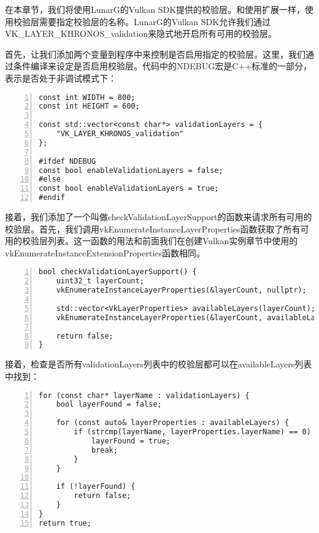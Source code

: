 \documentclass{ctexart}
\begin{document}
在本章节，我们将使用LunarG的Vulkan SDK提供的校验层。和使用扩展一样，使用校验层需要指定校验层的名称。LunarG的Vulkan SDK允许我们通过VK\_LAYER\_KHRONOS\_validation来隐式地开启所有可用的校验层。

首先，让我们添加两个变量到程序中来控制是否启用指定的校验层。这里，我们通过条件编译来设定是否启用校验层。代码中的NDEBUG宏是C++标准的一部分，表示是否处于非调试模式下：

\begin{lstlisting}[language={[ANSI]C},keywordstyle=\color{blue!70},commentstyle=\color{red!50!green!50!blue!50},frame=shadowbox, rulesepcolor=\color{red!20!green!20!blue!20},basicstyle=\small,numbers=left, numberstyle=\tiny,breaklines=true]
const int WIDTH = 800;
const int HEIGHT = 600;

const std::vector<const char*> validationLayers = {
	"VK_LAYER_KHRONOS_validation"
};

#ifdef NDEBUG
const bool enableValidationLayers = false;
#else
const bool enableValidationLayers = true;
#endif
\end{lstlisting}

接着，我们添加了一个叫做checkValidationLayerSupport的函数来请求所有可用的校验层。首先，我们调用vkEnumerateInstanceLayerProperties函数获取了所有可用的校验层列表。这一函数的用法和前面我们在创建Vulkan实例章节中使用的vkEnumerateInstanceExtensionProperties函数相同。

\begin{lstlisting}[language={[ANSI]C},keywordstyle=\color{blue!70},commentstyle=\color{red!50!green!50!blue!50},frame=shadowbox, rulesepcolor=\color{red!20!green!20!blue!20},basicstyle=\small,numbers=left, numberstyle=\tiny,breaklines=true]
bool checkValidationLayerSupport() {
	uint32_t layerCount;
	vkEnumerateInstanceLayerProperties(&layerCount, nullptr);

	std::vector<VkLayerProperties> availableLayers(layerCount);
	vkEnumerateInstanceLayerProperties(&layerCount, availableLayers.data());

	return false;
}
\end{lstlisting}

接着，检查是否所有validationLayers列表中的校验层都可以在availableLayers列表中找到：

\begin{lstlisting}[language={[ANSI]C},keywordstyle=\color{blue!70},commentstyle=\color{red!50!green!50!blue!50},frame=shadowbox, rulesepcolor=\color{red!20!green!20!blue!20},basicstyle=\small,numbers=left, numberstyle=\tiny,breaklines=true]
for (const char* layerName : validationLayers) {
	bool layerFound = false;

	for (const auto& layerProperties : availableLayers) {
		if (strcmp(layerName, layerProperties.layerName) == 0) {
			layerFound = true;
			break;
		}
	}

	if (!layerFound) {
		return false;
	}
}
return true;
\end{lstlisting}
\end{document}
